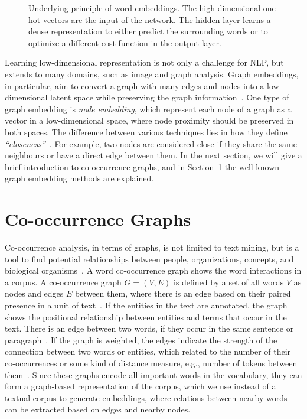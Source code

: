 \begin{figure}
\centering 
\resizebox{0.8\textwidth}{0.48\textwidth}{      

}
\caption{Underlying principle of word embeddings. The high-dimensional one-hot vectors are the input of the network. The hidden layer learns a dense representation to either predict the surrounding words or to optimize a different cost function in the output layer.}
\label{fig:emb}
\end{figure}
\noindent
Learning low-dimensional representation is not only a challenge for NLP, but extends to many domains, such as image and graph analysis. Graph embeddings, in particular,  aim to convert a graph with many edges and nodes into a low dimensional latent space while preserving the graph information~. One type of graph embedding is \emph{node embedding}, which represent each node of a graph as a vector in a low-dimensional space, where node proximity should be preserved in both spaces.
The difference between various techniques lies in how they define \emph{``closeness''}~. For example, two nodes are considered close if they share the same neighbours or have a direct edge between them. In the next section, we will give a brief introduction to co-occurrence graphs, and in Section~\ref{sec:graph} the well-known graph embedding methods are explained.  

\section{Co-occurrence Graphs}
\label{sec:graph}
Co-occurrence analysis, in terms of graphs, is not limited to text mining, but is a tool to find potential relationships between people, organizations, concepts, and biological organisms~. A word co-occurrence graph shows the word interactions in a corpus. A co-occurrence graph $G=(V,E)$ is defined by a set of all words $V$ as nodes and edges $E$ between them, where there is an edge based on their paired presence in a unit of text~. If the entities in the text are annotated, the graph shows the positional relationship between entities and terms that occur in the text. There is an edge between two words, if they occur in the same sentence or paragraph~. If the graph is weighted, the edges indicate the strength of the connection between two words or entities, which related to the number of their co-occurrences or some kind of distance measure, e.g., number of tokens between them~. Since these graphs encode all important words in the vocabulary, they can form a graph-based representation of the corpus, which we use instead of a textual corpus to generate embeddings, where relations between nearby words can be extracted based on edges and nearby nodes.\\

